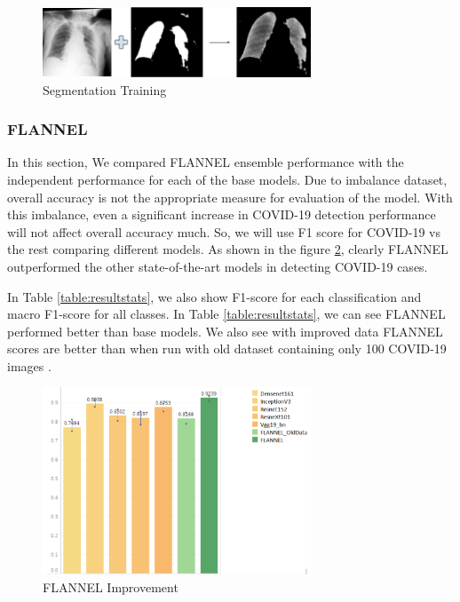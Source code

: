 \documentclass{sigkddExp}
\begin{document}
\begin{figure}[h]
    \includegraphics[width=8cm]{../doc/images/segmentation_training.png}
    \caption{Segmentation Training}
    \label{fig:segtrain}
\end{figure}

\subsubsection{FLANNEL}

In this section, We compared FLANNEL ensemble performance with the independent
performance for each of the base models. Due to imbalance dataset, overall
accuracy is not the appropriate measure for evaluation of the model. With this
imbalance, even a significant increase in COVID-19 detection performance will
not affect overall accuracy much. So, we will use F1 score for COVID-19 vs the
rest comparing different models. As shown in the figure \ref{fig:f1score},
clearly FLANNEL outperformed the other state-of-the-art models in detecting
COVID-19 cases.

In Table \ref{table:resultstats}, we also show F1-score for each classification
and macro F1-score for all classes. In Table \ref{table:resultstats}, we can see
FLANNEL performed better than base models. We also see with improved data FLANNEL
scores are better than when run with old dataset containing only 100 COVID-19 images
\cite{10.1093/jamia/ocaa280}.


\begin{figure}[H]
    \includegraphics[width=8cm]{../doc/images/F1Score_vs_rest.png}
    \caption{FLANNEL Improvement}
    \label{fig:f1score}
\end{figure}
\end{document}
